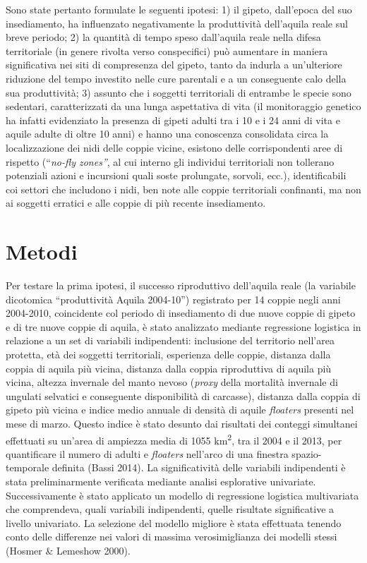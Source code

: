 Sono state pertanto formulate le seguenti ipotesi: 1) il gipeto,
dall{\textquoteright}epoca del suo insediamento, ha influenzato
negativamente la produttivit\`a dell{\textquoteright}aquila reale sul
breve periodo; 2) la quantit\`a di tempo speso
dall{\textquoteright}aquila reale nella difesa territoriale (in genere
rivolta verso conspecifici) pu\`o aumentare in maniera significativa
nei siti di compresenza del gipeto, tanto da indurla a
un{\textquoteright}ulteriore riduzione del tempo investito nelle cure
parentali e a un conseguente calo della sua produttivit\`a; 3) assunto
che i soggetti territoriali di entrambe le specie sono sedentari,
caratterizzati da una lunga aspettativa di vita (il monitoraggio
genetico ha infatti evidenziato la presenza di gipeti adulti tra i 10 e
i 24 anni di vita e aquile adulte di oltre 10 anni) e hanno una
conoscenza consolidata circa la localizzazione dei nidi delle coppie
vicine, esistono delle corrispondenti aree di rispetto
({\textquotedblleft}\textit{no-fly zones{\textquotedblright}}, al cui
interno gli individui territoriali non tollerano potenziali azioni e
incursioni quali soste prolungate, sorvoli, ecc.), identificabili coi
settori che includono i nidi, ben note alle coppie territoriali
confinanti, ma non ai soggetti erratici e alle coppie di pi\`u recente
insediamento.

\section*{Metodi}

Per testare la prima ipotesi, il successo riproduttivo
dell{\textquoteright}aquila reale (la variabile dicotomica
{\textquotedblleft}produttivit\`a Aquila 2004-10{\textquotedblright})
registrato per 14 coppie negli anni 2004-2010, coincidente col periodo
di insediamento di due nuove coppie di gipeto e di tre nuove coppie di
aquila, \`e stato analizzato mediante regressione logistica in
relazione a un set di variabili indipendenti: inclusione del territorio
nell{\textquoteright}area protetta, et\`a dei soggetti territoriali,
esperienza delle coppie, distanza dalla coppia di aquila pi\`u vicina,
distanza dalla coppia riproduttiva di aquila pi\`u vicina, altezza
invernale del manto nevoso (\textit{proxy} della mortalit\`a invernale
di ungulati selvatici e conseguente disponibilit\`a di carcasse),
distanza dalla coppia di gipeto pi\`u vicina e indice medio annuale di
densit\`a di aquile \textit{floaters} presenti nel mese di marzo.
Questo indice \`e stato desunto dai risultati dei conteggi simultanei
effettuati su un{\textquoteright}area di ampiezza media di 1055
km\textsuperscript{2}, tra il 2004 e il 2013, per  quantificare il
numero di adulti e \textit{floaters} nell{\textquoteright}arco di una
finestra spazio-temporale definita (Bassi 2014). La significativit\`a
delle variabili indipendenti \`e stata preliminarmente verificata
mediante analisi esplorative univariate. Successivamente \`e stato
applicato un modello di regressione logistica multivariata che
comprendeva, quali variabili indipendenti, quelle risultate
significative a livello univariato. La selezione del modello migliore
\`e stata effettuata tenendo conto delle differenze nei valori di
massima verosimiglianza dei modelli stessi (Hosmer \& Lemeshow 2000).

